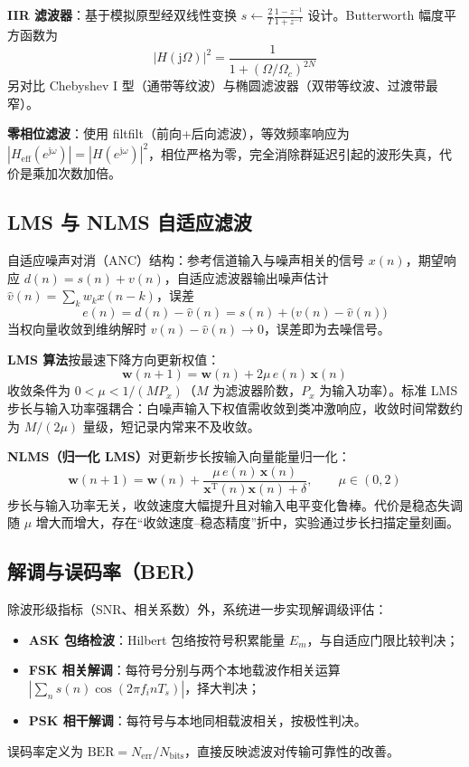 \documentclass[12pt, a4paper, UTF8]{ctexart}
\begin{document}
\textbf{IIR 滤波器}：基于模拟原型经双线性变换 $s \leftarrow \frac{2}{T}\frac{1-z^{-1}}{1+z^{-1}}$ 设计。Butterworth 幅度平方函数为
\begin{equation}
|H(\mathrm{j}\Omega)|^2 = \frac{1}{1+(\Omega/\Omega_c)^{2N}}
\end{equation}
另对比 Chebyshev I 型（通带等纹波）与椭圆滤波器（双带等纹波、过渡带最窄）。

\textbf{零相位滤波}：使用 filtfilt（前向+后向滤波），等效频率响应为 $|H_{\mathrm{eff}}(e^{\mathrm{j}\omega})|=|H(e^{\mathrm{j}\omega})|^2$，相位严格为零，完全消除群延迟引起的波形失真，代价是乘加次数加倍。

\subsection{LMS 与 NLMS 自适应滤波}

自适应噪声对消（ANC）结构：参考信道输入与噪声相关的信号 $x(n)$，期望响应 $d(n)=s(n)+v(n)$，自适应滤波器输出噪声估计 $\hat{v}(n)=\sum_k w_k x(n-k)$，误差
\begin{equation}
e(n) = d(n) - \hat{v}(n) = s(n) + \big(v(n)-\hat{v}(n)\big)
\end{equation}
当权向量收敛到维纳解时 $v(n)-\hat{v}(n)\to 0$，误差即为去噪信号。

\textbf{LMS 算法}按最速下降方向更新权值：
\begin{equation}
\bm{w}(n+1) = \bm{w}(n) + 2\mu\, e(n)\,\bm{x}(n)
\end{equation}
收敛条件为 $0<\mu<1/(M P_x)$（$M$ 为滤波器阶数，$P_x$ 为输入功率）。标准 LMS 步长与输入功率强耦合：白噪声输入下权值需收敛到类冲激响应，收敛时间常数约为 $M/(2\mu)$ 量级，短记录内常来不及收敛。

\textbf{NLMS（归一化 LMS）}对更新步长按输入向量能量归一化：
\begin{equation}
\bm{w}(n+1) = \bm{w}(n) + \frac{\mu\, e(n)\,\bm{x}(n)}{\bm{x}^{\mathrm{T}}(n)\bm{x}(n)+\delta}, \qquad \mu\in(0,2)
\end{equation}
步长与输入功率无关，收敛速度大幅提升且对输入电平变化鲁棒。代价是稳态失调随 $\mu$ 增大而增大，存在``收敛速度--稳态精度''折中，实验通过步长扫描定量刻画。

\subsection{解调与误码率（BER）}

除波形级指标（SNR、相关系数）外，系统进一步实现解调级评估：
\begin{itemize}
  \item \textbf{ASK 包络检波}：Hilbert 包络按符号积累能量 $E_m$，与自适应门限比较判决；
  \item \textbf{FSK 相关解调}：每符号分别与两个本地载波作相关运算 $\left|\sum_n s(n)\cos(2\pi f_i nT_s)\right|$，择大判决；
  \item \textbf{PSK 相干解调}：每符号与本地同相载波相关，按极性判决。
\end{itemize}
误码率定义为 $\mathrm{BER} = N_{\mathrm{err}}/N_{\mathrm{bits}}$，直接反映滤波对传输可靠性的改善。
\end{document}
